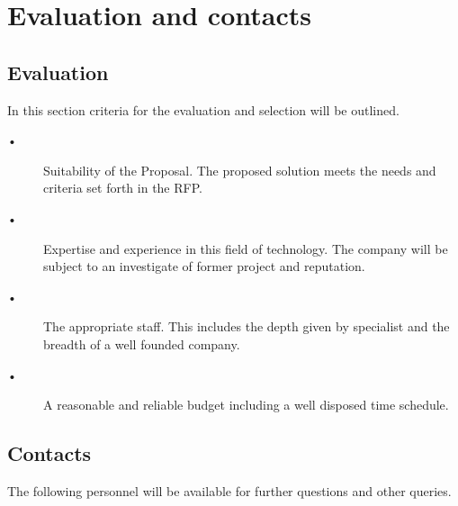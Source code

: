 \chapter{Evaluation and contacts}
\section{Evaluation}
In this section criteria for the evaluation and selection will be outlined. 

\begin{description}
\item[•] Suitability of the Proposal. The proposed solution meets the needs and criteria set forth in the RFP. 

\item[•] Expertise and experience in this field of technology. The company will be subject to an investigate of former project and reputation. 

\item[•] The appropriate staff. This includes the depth given by specialist and the breadth of a well founded company. 

\item[•] A reasonable and reliable budget including a well disposed time schedule. 

\end{description}

\section{Contacts}
The following personnel will be available for further questions and other queries.

 \\
 \\